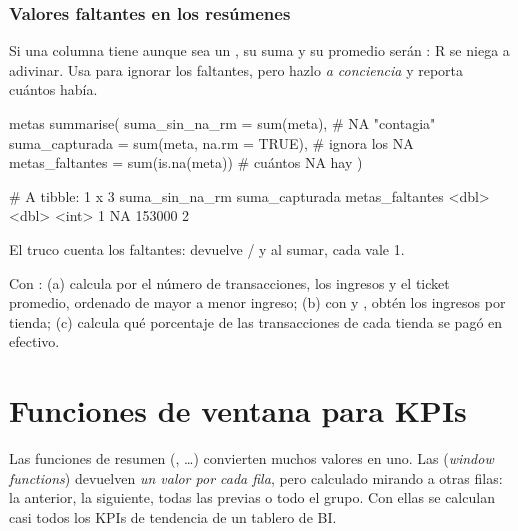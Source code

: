 \subsubsection{Valores faltantes en los resúmenes}

Si una columna tiene aunque sea un , su suma y su promedio serán
: R se niega a adivinar. Usa  para ignorar
los faltantes, pero hazlo \emph{a conciencia} y reporta cuántos había.

\begin{rcode}
metas %
  summarise(
    suma_sin_na_rm  = sum(meta),               # NA "contagia"
    suma_capturada  = sum(meta, na.rm = TRUE), # ignora los NA
    metas_faltantes = sum(is.na(meta))         # cuántos NA hay
  )
\end{rcode}
\begin{rsalida}
# A tibble: 1 x 3
  suma_sin_na_rm suma_capturada metas_faltantes
           <dbl>          <dbl>           <int>
1             NA         153000               2
\end{rsalida}

El truco  cuenta los faltantes: 
devuelve / y al sumar, cada  vale 1.

\begin{hazlotu}
Con : (a) calcula por  el número
de transacciones, los ingresos y el ticket promedio, ordenado de mayor a
menor ingreso; (b) con  y , obtén los ingresos
por tienda; (c) calcula qué porcentaje de las transacciones de cada tienda
se pagó en efectivo.
\end{hazlotu}

\section{Funciones de ventana para KPIs}
\label{sec:m2-ventana}

Las funciones de resumen (, \ldots) convierten
muchos valores en uno. Las  (\emph{window
functions}) devuelven \emph{un valor por cada fila}, pero calculado mirando
a otras filas: la anterior, la siguiente, todas las previas o todo el grupo.
Con ellas se calculan casi todos los KPIs de tendencia de un tablero de BI.


